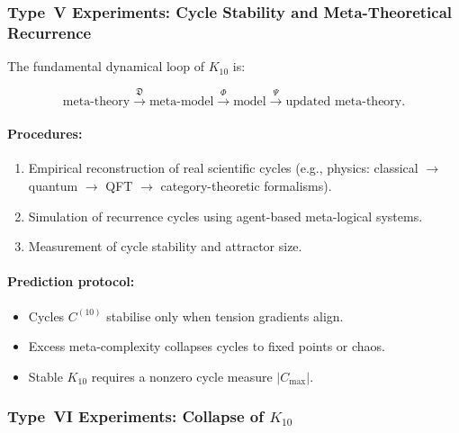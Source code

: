 \subsubsection{Type~V Experiments: Cycle Stability and Meta-Theoretical Recurrence}

The fundamental dynamical loop of $K_{10}$ is:

\[
\text{meta-theory} 
   \xrightarrow{\mathfrak{D}}
\text{meta-model}
   \xrightarrow{\Phi}
\text{model}
   \xrightarrow{\Psi}
\text{updated meta-theory}.
\]

\paragraph{Procedures:}

\begin{enumerate}
    \item Empirical reconstruction of real scientific cycles 
          (e.g., physics: classical $\to$ quantum $\to$ QFT $\to$ 
          category-theoretic formalisms).
    \item Simulation of recurrence cycles using agent-based meta-logical 
          systems.
    \item Measurement of cycle stability and attractor size.
\end{enumerate}

\paragraph{Prediction protocol:}

\begin{itemize}
    \item Cycles $C^{(10)}$ stabilise only when tension gradients align.
    \item Excess meta-complexity collapses cycles to fixed points or chaos.
    \item Stable $K_{10}$ requires a nonzero cycle measure $|C_{\max}|$.
\end{itemize}



\subsubsection{Type~VI Experiments: Collapse of $K_{10}$}

